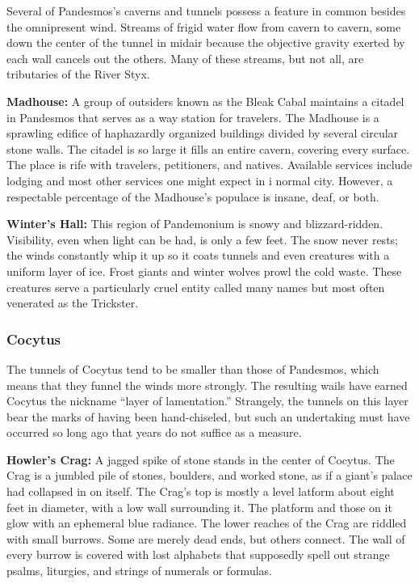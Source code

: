 Several of Pandesmos's caverns and tunnels possess a feature in common besides the omnipresent wind. Streams of frigid water flow from cavern to cavern, some down the center of the tunnel in midair because the objective gravity exerted by each wall cancels out the others. Many of these streams, but not all, are tributaries of the River Styx.

\textbf{Madhouse:} A group of outsiders known as the Bleak Cabal maintains a citadel in Pandesmos that serves as a way station for travelers. The Madhouse is a sprawling edifice of haphazardly organized buildings divided by several circular stone walls. The citadel is so large it fills an entire cavern, covering every surface. The place is rife with travelers, petitioners, and natives. Available services include lodging and most other services one might expect in i normal city. However, a respectable percentage of the Madhouse's populace is insane, deaf, or both.

\textbf{Winter's Hall:} This region of Pandemonium is snowy and blizzard-ridden. Visibility, even when light can be had, is only a few feet. The snow never rests; the winds constantly whip it up so it coats tunnels and even creatures with a uniform layer of ice. Frost giants and winter wolves prowl the cold waste. These creatures serve a particularly cruel entity called many names but most often venerated as the Trickster.

\subsubsection{Cocytus}
The tunnels of Cocytus tend to be smaller than those of Pandesmos, which means that they funnel the winds more strongly. The resulting wails have earned Cocytus the nickname ``layer of lamentation.'' Strangely, the tunnels on this layer bear the marks of having been hand-chiseled, but such an undertaking must have occurred so long ago that years do not suffice as a measure.

\textbf{Howler's Crag:} A jagged spike of stone stands in the center of Cocytus. The Crag is a jumbled pile of stones, boulders, and worked stone, as if a giant's palace had collapsed in on itself. The Crag's top is mostly a level latform about eight feet in diameter, with a low wall surrounding it. The platform and those on it glow with an ephemeral blue radiance. The lower reaches of the Crag are riddled with small burrows. Some are merely dead ends, but others connect. The wall of every burrow is covered with lost alphabets that supposedly spell out strange psalms, liturgies, and strings of numerals or formulas.


